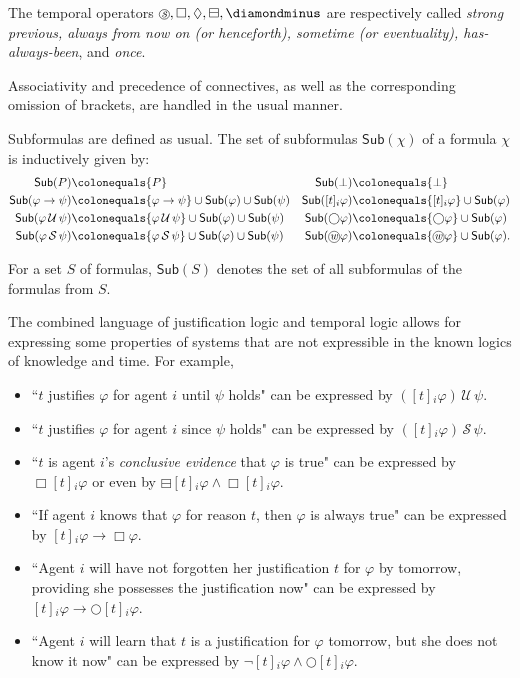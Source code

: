 \documentclass[envcountsect,envcountsame,oribibl,orivec]{llncs}
\newcommand*\circled[1]{\tikz[baseline=(char.base)]{
		\node[shape=circle,draw,inner sep=0.4pt] (char) {#1};}}
\newcommand{\lnext}{\bigcirc}
\newcommand{\lalways}{\Box}
\newcommand{\leventually}{\Diamond}
\newcommand{\lonce}{\diamondminus}
\newcommand{\lsofar}{\boxminus}
\newcommand{\luntil}{{\,\mathcal{U}\,}}
\newcommand{\lsince}{{\,\mathcal{S}\,}}
\newcommand{\wprevious}{\circled{\textit{w}}}
\newcommand{\sprevious}{\circled{\textit{s}}}
\newcommand{\jbox}[1]{\left[#1\right]\!}
\newcommand{\agent}{i}
\renewcommand{\phi}{\varphi}
\newcommand{\Sub}{\mathsf{Sub}}
\begin{document}
The temporal operators $\sprevious, \lalways, \leventually, \lsofar, \lonce$ are respectively called \textit{strong previous, always from now on (or henceforth), sometime (or eventuality), has-always-been}, and \textit{once}.

Associativity and precedence of connectives, as well as the corresponding omission of brackets, are handled in the usual manner.

Subformulas are defined as usual. The set of subformulas $\Sub(\chi)$ of a formula $\chi$ is inductively given by:
 \begin{align*}
 \Sub(P) &\colonequals \{P\}  & \Sub(\bot) &\colonequals \{\bot\}\\
 \Sub(\phi \to \psi) &\colonequals \{\phi \to \psi\} \cup \Sub(\phi) \cup \Sub(\psi) & \Sub(\jbox{t}_\agent\phi) &\colonequals \{\jbox{t}_\agent\phi\} \cup \Sub(\phi) \\
  \Sub(\phi \luntil \psi ) &\colonequals \{\phi \luntil \psi\} \cup \Sub(\phi) \cup \Sub(\psi) & \Sub(\lnext \phi) &\colonequals \{\lnext \phi\} \cup \Sub(\phi) \\
  \Sub(\phi \lsince \psi ) &\colonequals \{\phi \lsince \psi\} \cup \Sub(\phi) \cup \Sub(\psi) & \Sub(\wprevious\phi) &\colonequals \{\wprevious\phi\} \cup \Sub(\phi).
 \end{align*}

For a set $S$ of formulas, $\Sub(S)$ denotes the set of all subformulas of
the formulas from $S$.

The combined language of justification logic and temporal logic allows for expressing some properties of systems that are not expressible in the known logics of knowledge and time. For example,

\begin{itemize}
	\item ``$t$ justifies $\phi$ for agent $i$ until $\psi$ holds" can be expressed by $(\jbox{t}_i \phi) \luntil \psi$.  

	\item ``$t$ justifies $\phi$ for agent $i$ since $\psi$ holds" can be expressed by $(\jbox{t}_i \phi) \lsince \psi$. 
	
	\item ``$t$ is agent $i$'s \textit{conclusive evidence} that $\phi$ is true" can be expressed by $\lalways \jbox{t}_i \phi$ or even by $\lsofar \jbox{t}_i \phi \wedge \lalways  \jbox{t}_i \phi$.
	
	\item ``If agent $i$ knows that $\phi$ for reason $t$, then  $\phi$ is always true" can be expressed by $\jbox{t}_i \phi \to \lalways \phi$. 
	
	\item ``Agent $i$ will have not forgotten her justification $t$ for $\phi$ by tomorrow, providing she possesses the justification now" can be expressed by $\jbox{t}_i \phi \to \lnext \jbox{t}_i  \phi$. 
	
	\item ``Agent $i$ will learn that $t$ is a justification for $\phi$  tomorrow, but she does not know it now" can be expressed by $\neg \jbox{t}_i \phi \wedge \lnext \jbox{t}_i  \phi$. 
\end{itemize}
\end{document}
